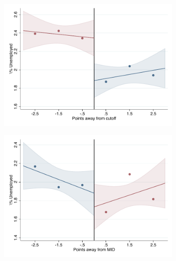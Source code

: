 \documentclass[oneside,11pt]{article}
\begin{document}
\begin{figure}[H]
\begin{center}
    \begin{subfigure}{0.475\textwidth}
        \centering
        \includegraphics[width=\textwidth]{04_Figures/rd_plot_tau_Unemployed_UNAM3.pdf}
    \end{subfigure}
    \begin{subfigure}{0.475\textwidth}
        \centering
        \includegraphics[width=\textwidth]{04_Figures/rd_plot_mid_Unemployed_UNAM3.pdf}
    \end{subfigure}


\end{center}
\end{figure}
\end{document}
